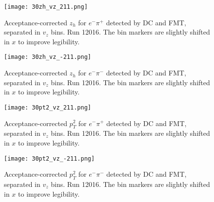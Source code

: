     \begin{figure}
        \centering
        \texttt{[image: 30zh\_vz\_211.png]}
        \caption[Acceptance-corrected $z_h$ for $e^-\pi^+$ separated in $v_z$ bins, run 12016]
        {Acceptance-corrected $z_h$ for $e^-\pi^+$ detected by DC and FMT, separated in $v_z$ bins.
        Run 12016.
        The bin markers are slightly shifted in $x$ to improve legibility.}
        \label{fig::14.30::zh_211_vz}
    \end{figure}

    \begin{figure}
        \centering
        \texttt{[image: 30zh\_vz\_-211.png]}
        \caption[Acceptance-corrected $z_h$ for $e^-\pi^-$ separated in $v_z$ bins, run 12016]
        {Acceptance-corrected $z_h$ for $e^-\pi^-$ detected by DC and FMT, separated in $v_z$ bins.
        Run 12016.
        The bin markers are slightly shifted in $x$ to improve legibility.}
        \label{fig::14.30::zh_-211_vz}
    \end{figure}

    \begin{figure}
        \centering
        \texttt{[image: 30pt2\_vz\_211.png]}
        \caption[Acceptance-corrected $p_T^2$ for $e^-\pi^+$ separated in $v_z$ bins, run 12016]
        {Acceptance-corrected $p_T^2$ for $e^-\pi^+$ detected by DC and FMT, separated in $v_z$ bins.
        Run 12016.
        The bin markers are slightly shifted in $x$ to improve legibility.}
        \label{fig::14.30::pt2_211_vz}
    \end{figure}

    \begin{figure}
        \centering
        \texttt{[image: 30pt2\_vz\_-211.png]}
        \caption[Acceptance-corrected $p_T^2$ for $e^-\pi^-$ separated in $v_z$ bins, run 12016]
        {Acceptance-corrected $p_T^2$ for $e^-\pi^-$ detected by DC and FMT, separated in $v_z$ bins.
        Run 12016.
        The bin markers are slightly shifted in $x$ to improve legibility.}
        \label{fig::14.30::pt2_-211_vz}
    \end{figure}

